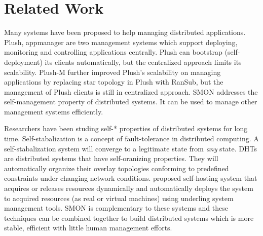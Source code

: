 \section{Related Work}
\label{sec:related}

Many systems have been proposed to help managing distributed
applications. Plush, appmanager are two management systems
which support deploying, monitoring and controlling
applications centrally. Plush can bootstrap
(self-deployment) its clients automatically, but the
centralized approach limits its scalability. Plush-M further
improved Plush's scalability on managing applications by
replacing star topology in Plush with RanSub, but the
management of Plush clients is still in centralized
approach. SMON addresses the self-management property of
distributed systems. It can be used to manage other
management systems efficiently.

Researchers have been studing self-* properties of
distributed systems for long time. Self-stabalization is a
concept of fault-tolerance in distributed computing. A
self-stabalization system will converge to a legitimate
state from \emph{any} state. DHTs are distributed systems
that have self-oranizing properties. They will automatically
organize their overlay topologies conforming to predefined
constraints under changing network conditions.
\cite{self-host} proposed self-hosting system that acquires
or releases resources dynamically and automatically deploys
the system to acquired resources (as real or virtual
machines) using underling system management tools. SMON is
complementary to these systems and these techniques can be
combined together to build distributed systems which is more
stable, efficient with little human management efforts.




